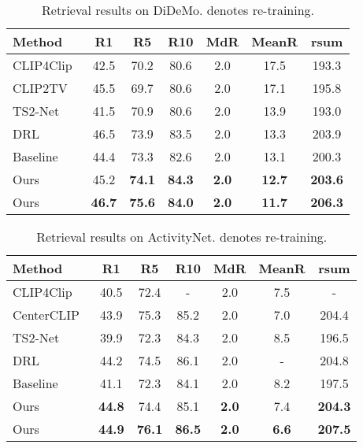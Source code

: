 \documentclass[sigconf]{acmart}
\begin{document}
\begin{table}[]
\centering
    \caption{Retrieval results on DiDeMo.  denotes re-training.}\label{tab:res_didemo}
    \renewcommand{\arraystretch}{0.8}\setlength\tabcolsep{2pt}\begin{tabular}{l| c c c c c c}
        \toprule
         {Method} & {R1} & {R5} & {R10} & {MdR} & {MeanR} & {rsum} \\ \toprule
        {CLIP4Clip~\cite{clip4clip2021}} & 42.5	&70.2	&80.6	&2.0	&17.5	&193.3 \\ 
        {CLIP2TV~\cite{clip2tv2021}} & 45.5	&69.7	&80.6	&2.0	&17.1	&195.8 \\ 
{TS2-Net~\cite{ts2net2022}} & 41.5& 70.9& 80.6& 2.0& 13.9& 193.0 \\ 
{DRL~\cite{drl2022}} & 46.5& 73.9& 83.5& 2.0& 13.3& 203.9 \\ 
{Baseline} &  44.4	&73.3	&82.6	&2.0	&13.1	&200.3 \\ {Ours} & 45.2	&\textbf{74.1}	&\textbf{84.3}	&\textbf{2.0}	&\textbf{12.7}	&\textbf{203.6} \\{Ours} &\textbf{46.7}	&\textbf{75.6}	&\textbf{84.0}	&\textbf{2.0}	&\textbf{11.7}	&\textbf{206.3}  \\ \bottomrule
    \end{tabular}
\end{table}

\begin{table}[]
\centering
    \caption{Retrieval results on ActivityNet.  denotes re-training.}
    \label{tab:res_activity}
    \renewcommand{\arraystretch}{0.8}\setlength\tabcolsep{2pt}\begin{tabular}{l| c c c c c c}
        \toprule
         {Method} & {R1} & {R5} & {R10} & {MdR} & {MeanR} & {rsum} \\ \toprule
        {CLIP4Clip~\cite{clip4clip2021}} &40.5	&72.4	&-	&2.0	&7.5	&-  \\  {CenterCLIP~\cite{centerclip2022}} &43.9 	&75.3 	&85.2 	&2.0 	&7.0 	&204.4 \\
{TS2-Net~\cite{ts2net2022}} & 39.9&  72.3&  84.3&  2.0&  8.5&  196.5 \\ 
        {DRL~\cite{drl2022}} & 44.2	& 74.5	& 86.1	& 2.0	& - & 204.8 \\     {Baseline} &41.1& 72.3&84.1& 2.0& 8.2& 197.5 \\  {Ours} &\textbf{44.8}& 74.4& 85.1& \textbf{2.0}& 7.4& \textbf{204.3}   \\  {Ours} &\textbf{44.9}& \textbf{76.1}& \textbf{86.5}& \textbf{2.0}& \textbf{6.6}& \textbf{207.5}  \\ \bottomrule
    \end{tabular}
  \vspace{-0.2cm}
\end{table}
\end{document}
